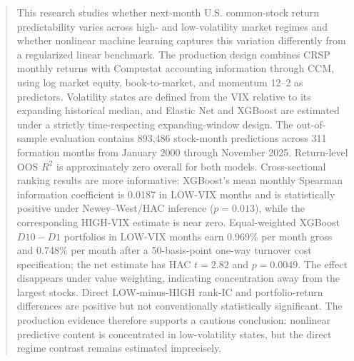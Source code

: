 \begin{abstract}
This research studies whether next-month U.S. common-stock return predictability varies across high- and low-volatility market regimes and whether nonlinear machine learning captures this variation differently from a regularized linear benchmark. The production design combines CRSP monthly returns with Compustat accounting information through CCM, using log market equity, book-to-market, and momentum 12--2 as predictors. Volatility states are defined from the VIX relative to its expanding historical median, and Elastic Net and XGBoost are estimated under a strictly time-respecting expanding-window design. The out-of-sample evaluation contains 893,486 stock-month predictions across 311 formation months from January 2000 through November 2025. Return-level OOS $R^2$ is approximately zero overall for both models. Cross-sectional ranking results are more informative: XGBoost's mean monthly Spearman information coefficient is 0.0187 in LOW-VIX months and is statistically positive under Newey--West/HAC inference ($p=0.013$), while the corresponding HIGH-VIX estimate is near zero. Equal-weighted XGBoost $D10-D1$ portfolios in LOW-VIX months earn 0.969\% per month gross and 0.748\% per month after a 50-basis-point one-way turnover cost specification; the net estimate has HAC $t=2.82$ and $p=0.0049$. The effect disappears under value weighting, indicating concentration away from the largest stocks. Direct LOW-minus-HIGH rank-IC and portfolio-return differences are positive but not conventionally statistically significant. The production evidence therefore supports a cautious conclusion: nonlinear predictive content is concentrated in low-volatility states, but the direct regime contrast remains estimated imprecisely.
\end{abstract}
